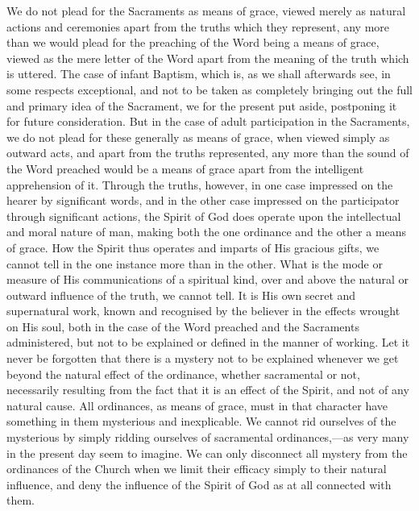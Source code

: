 \documentclass[]{book}
\begin{document}
We do not plead for the Sacraments as means of grace, viewed merely as natural actions and ceremonies apart from the truths which they represent, any more than we would plead for the preaching of the Word being a means of grace, viewed as the mere letter of the Word apart from the meaning of the truth which is uttered. The case of infant Baptism, which is, as we shall afterwards see, in some respects exceptional, and not to be taken as completely bringing out the full and primary idea of the Sacrament, we for the present put aside, postponing it for future consideration. But in the case of adult participation in the Sacraments, we do not plead for these generally as means of grace, when viewed simply as outward acts, and apart from the truths represented, any more than the sound of the Word preached would be a means of grace apart from the intelligent apprehension of it. Through the truths, however, in one case impressed on the hearer by significant words, and in the other case impressed on the participator through significant actions, the Spirit of God does operate upon the intellectual and moral nature of man, making both the one ordinance and the other a means of grace. How the Spirit thus operates and imparts of His gracious gifts, we cannot tell in the one instance more than in the other. What is the mode or measure of His communications of a spiritual kind, over and above the natural or outward influence of the truth, we cannot tell. It is His own secret and supernatural work, known and recognised by the believer in the effects wrought on His soul, both in the case of the Word preached and the Sacraments administered, but not to be explained or defined in the manner of working. Let it never be forgotten that there is a mystery not to be explained whenever we get beyond the natural effect of the ordinance, whether sacramental or not, necessarily resulting from the fact that it is an effect of the Spirit, and not of any natural cause. All ordinances, as means of grace, must in that character have something in them mysterious and inexplicable. We cannot rid ourselves of the mysterious by simply ridding ourselves of sacramental ordinances,---as very many in the present day seem to imagine. We can only disconnect all mystery from the ordinances of the Church when we limit their efficacy simply to their natural influence, and deny the influence of the Spirit of God as at all connected with them.
\end{document}
